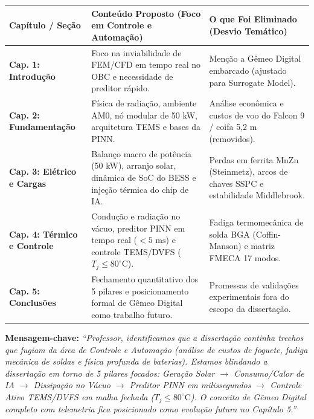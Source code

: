 \documentclass[11pt,a4paper]{article}
\begin{document}
\begin{table}[h!]
\centering
\small
\begin{tabularx}{\textwidth}{p{3.8cm}Xp{4.2cm}}
    \toprule
    \textbf{Capítulo / Seção} & \textbf{Conteúdo Proposto (Foco em Controle e Automação)} & \textbf{O que Foi Eliminado (Desvio Temático)} \\
    \midrule
    \textbf{Cap. 1: Introdução} & Foco na inviabilidade de FEM/CFD em tempo real no OBC e necessidade de preditor rápido. & Menção a Gêmeo Digital embarcado (ajustado para Surrogate Model). \\
    \addlinespace
    \textbf{Cap. 2: Fundamentação} & Física de radiação, ambiente AM0, nó modular de 50 kW, arquitetura TEMS e bases da PINN. & Análise econômica e custos de voo do Falcon 9 / coifa 5,2 m (removidos). \\
    \addlinespace
    \textbf{Cap. 3: Elétrico e Cargas} & Balanço macro de potência (50 kW), arranjo solar, dinâmica de SoC do BESS e injeção térmica do chip de IA. & Perdas em ferrita MnZn (Steinmetz), arcos de chaves SSPC e estabilidade Middlebrook. \\
    \addlinespace
    \textbf{Cap. 4: Térmico e Controle} & Condução e radiação no vácuo, preditor PINN em tempo real ($<5\text{ ms}$) e controle TEMS/DVFS ($T_j \le 80^\circ\text{C}$). & Fadiga termomecânica de solda BGA (Coffin-Manson) e matriz FMECA 17 modos. \\
    \addlinespace
    \textbf{Cap. 5: Conclusões} & Fechamento quantitativo dos 5 pilares e posicionamento formal de Gêmeo Digital como trabalho futuro. & Promessas de validações experimentais fora do escopo da dissertação. \\
    \bottomrule
\end{tabularx}
\end{table}

\vspace{6pt}
\begin{tcolorbox}[colback=white, colframe=darkgray, title=\color{darkgray}\textbf{RESUMO DA ESTRATÉGIA PARA APRESENTAÇÃO AO ORIENTADOR}]
\small
\textbf{Mensagem-chave:} \textit{``Professor, identificamos que a dissertação continha trechos que fugiam da área de Controle e Automação (análise de custos de foguete, fadiga mecânica de soldas e física profunda de baterias). Estamos blindando a dissertação em torno de 5 pilares focados: Geração Solar $\to$ Consumo/Calor de IA $\to$ Dissipação no Vácuo $\to$ Preditor PINN em milissegundos $\to$ Controle Ativo TEMS/DVFS em malha fechada ($T_j \le 80^\circ\text{C}$). O conceito de Gêmeo Digital completo com telemetria fica posicionado como evolução futura no Capítulo 5.''}
\end{tcolorbox}
\end{document}
